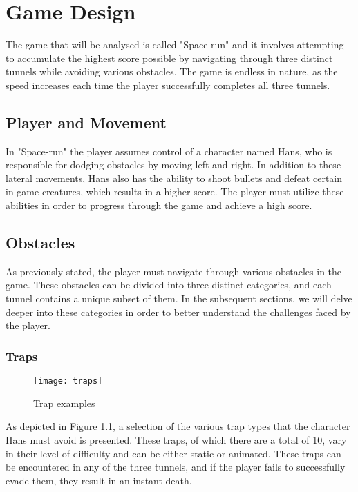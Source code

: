 \chapter{Game Design}
The game that will be analysed is called "Space-run" and it involves attempting to accumulate the highest score possible by navigating through three distinct tunnels while avoiding various obstacles. The game is endless in nature, as the speed increases each time the player successfully completes all three tunnels.

\section{Player and Movement}
In "Space-run" the player assumes control of a character named Hans, who is responsible for dodging obstacles by moving left and right. In addition to these lateral movements, Hans also has the ability to shoot bullets and defeat certain in-game creatures, which results in a higher score. The player must utilize these abilities in order to progress through the game and achieve a high score.

\section{Obstacles}
As previously stated, the player must navigate through various obstacles in the game. These obstacles can be divided into three distinct categories, and each tunnel contains a unique subset of them. In the subsequent sections, we will delve deeper into these categories in order to better understand the challenges faced by the player.

\subsection{Traps}
\begin{figure}[h]
    \centering
    \texttt{[image: traps]}
    \caption{Trap examples}
    \label{fig:mesh1}
\end{figure}
As depicted in Figure \ref{fig:mesh1}, a selection of the various trap types that the character Hans must avoid is presented. These traps, of which there are a total of 10, vary in their level of difficulty and can be either static or animated. These traps can be encountered in any of the three tunnels, and if the player fails to successfully evade them, they result in an instant death.


